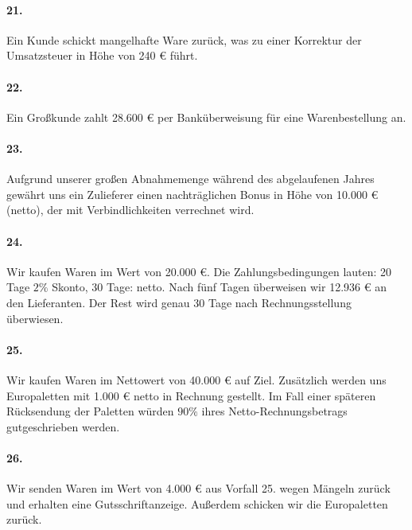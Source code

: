 \documentclass[paper=a4, fontsize=11pt]{scrartcl}
\numberwithin{equation}{section}
\numberwithin{figure}{section}
\numberwithin{table}{section}
\begin{document}
{\paragraph{21.}

Ein Kunde schickt mangelhafte Ware zurück, was zu einer Korrektur der Umsatzsteuer in Höhe von 240 € führt. \\

\paragraph{22.}

Ein Großkunde zahlt 28.600 € per Banküberweisung für eine Warenbestellung an. \\

\paragraph{23.}

Aufgrund unserer großen Abnahmemenge während des abgelaufenen Jahres gewährt uns ein Zulieferer einen nachträglichen Bonus in Höhe von 10.000 € (netto), der mit Verbindlichkeiten verrechnet wird. \\

\paragraph{24.}

Wir kaufen Waren im Wert von 20.000 €. Die Zahlungsbedingungen lauten: 20 Tage $2 \%$ Skonto, 30 Tage: netto. Nach fünf Tagen überweisen wir 12.936 € an den Lieferanten. Der Rest wird genau 30 Tage nach Rechnungsstellung überwiesen. \\

\paragraph{25.}

Wir kaufen Waren im Nettowert von 40.000 € auf Ziel. Zusätzlich werden uns Europaletten mit 1.000 € netto in Rechnung gestellt. Im Fall einer späteren Rücksendung der Paletten würden $90 \%$ ihres Netto-Rechnungsbetrags gutgeschrieben werden. \\  

\paragraph{26.}

Wir senden Waren im Wert von 4.000 € aus Vorfall 25. wegen Mängeln zurück und erhalten eine Gutsschriftanzeige. Außerdem schicken wir die Europaletten zurück. \\

}
\end{document}
